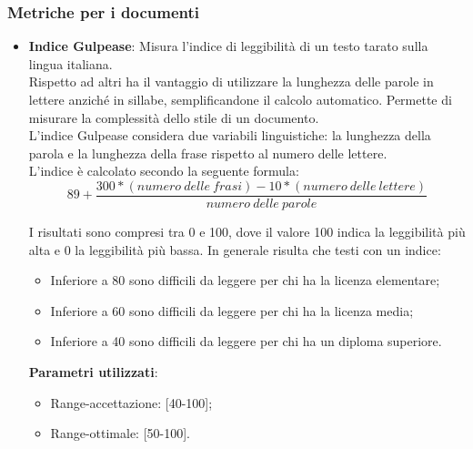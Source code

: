\subsubsection{Metriche per i documenti}
\label{sec:metricadocumenti}
\begin{itemize}
\item \textbf{Indice Gulpease}: Misura l'indice di leggibilità di un testo tarato sulla lingua italiana.\\
Rispetto ad altri ha il vantaggio di utilizzare la lunghezza delle parole in lettere anziché in sillabe, semplificandone il calcolo automatico. Permette di misurare la complessità dello stile di un documento.\\
L'indice Gulpease considera due variabili linguistiche: la lunghezza della parola e la lunghezza della frase rispetto al numero delle lettere.\\
L'indice è calcolato secondo la seguente formula:\\


\[89 + \frac{300 *(numero\ delle\ frasi) -10 *(numero\ delle\ lettere)}{numero\ delle\ parole}\]

I risultati sono compresi tra 0 e 100, dove il valore 100 indica la leggibilità più alta e 0 la leggibilità più bassa. In generale risulta che testi con un indice:

\begin{itemize}
	\item Inferiore a 80 sono difficili da leggere per chi ha la licenza elementare;
	\item Inferiore a 60 sono difficili da leggere per chi ha la licenza media;
	\item Inferiore a 40 sono difficili da leggere per chi ha un diploma superiore.
\end{itemize}

\textbf{Parametri utilizzati}:
\begin{itemize}
	\item Range-accettazione: [40-100];
	\item Range-ottimale: [50-100].
\end{itemize}
\end{itemize}